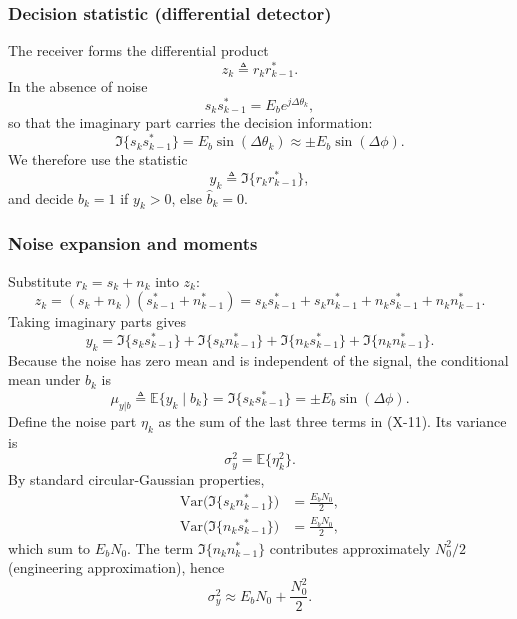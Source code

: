 \documentclass[conference]{IEEEtran}
\begin{document}
\subsubsection{Decision statistic (differential detector)}
The receiver forms the differential product
\begin{equation}
 \label{eq:z_def}
z_k\triangleq r_k r_{k-1}^*.
\end{equation}
In the absence of noise
\begin{equation}
\label{eq:sk_product}
s_k s_{k-1}^*=E_b e^{j\Delta\theta_k},
\end{equation}
so that the imaginary part carries the decision information:
\begin{equation}
\label{eq:im_ss}
\Im\{s_k s_{k-1}^*\}=E_b\sin(\Delta\theta_k)\approx\pm E_b\sin(\Delta\phi).
\end{equation}
We therefore use the statistic
\begin{equation}
\label{eq:y_stat}
y_k\triangleq\Im\{r_k r_{k-1}^*\},
\end{equation}
and decide $\hat b_k=1$ if $y_k>0$, else $\hat b_k=0$.

\subsubsection{Noise expansion and moments}
Substitute $r_k=s_k+n_k$ into $z_k$:
\begin{equation}
\tag{X-10}
z_k=(s_k+n_k)(s_{k-1}^*+n_{k-1}^*)
=s_k s_{k-1}^*+s_k n_{k-1}^*+n_k s_{k-1}^*+n_k n_{k-1}^*.
\end{equation}
Taking imaginary parts gives
\begin{equation}
\tag{X-11}
y_k=\Im\{s_k s_{k-1}^*\}+\Im\{s_k n_{k-1}^*\}+\Im\{n_k s_{k-1}^*\}+\Im\{n_k n_{k-1}^*\}.
\end{equation}
Because the noise has zero mean and is independent of the signal, the conditional mean under $b_k$ is
\begin{equation}
\tag{X-13}
\mu_{y|b}\triangleq\mathbb{E}\{y_k\mid b_k\}=\Im\{s_k s_{k-1}^*\}=\pm E_b\sin(\Delta\phi).
\end{equation}
Define the noise part $\eta_k$ as the sum of the last three terms in (X-11). Its variance is
\begin{equation}
\tag{X-15}
\sigma_y^2=\mathbb{E}\{\eta_k^2\}.
\end{equation}
By standard circular-Gaussian properties,
\begin{align}
\tag{X-18}
\mathrm{Var}\big(\Im\{s_k n_{k-1}^*\}\big)&=\frac{E_bN_0}{2},\\
\tag{X-19}
\mathrm{Var}\big(\Im\{n_k s_{k-1}^*\}\big)&=\frac{E_bN_0}{2},
\end{align}
which sum to $E_bN_0$. The term $\Im\{n_k n_{k-1}^*\}$ contributes approximately $N_0^2/2$ (engineering approximation), hence
\begin{equation}
\tag{X-23}
\sigma_y^2\approx E_bN_0+\frac{N_0^2}{2}.
\end{equation}
\end{document}
